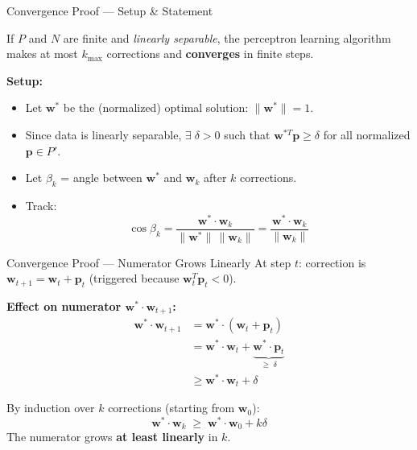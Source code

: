 \documentclass{beamer}
\begin{document}
\begin{frame}{Convergence Proof --- Setup \& Statement}
  \begin{theorem}
    If $P$ and $N$ are finite and \emph{linearly separable}, the perceptron learning
    algorithm makes at most $k_{\max}$ corrections and \textbf{converges} in finite steps.
  \end{theorem}

  \vspace{0.2cm}
  \textbf{Setup:}
  \begin{itemize}
    \item Let $\mathbf{w}^*$ be the (normalized) optimal solution: $\|\mathbf{w}^*\| = 1$.
    \item Since data is linearly separable, $\exists\;\delta > 0$ such that
          $\mathbf{w}^{*T}\mathbf{p} \geq \delta$ for all normalized $\mathbf{p} \in P'$.
    \item Let $\beta_k$ = angle between $\mathbf{w}^*$ and $\mathbf{w}_k$ after $k$ corrections.
    \item Track:
    \[
      \cos\beta_k = \frac{\mathbf{w}^*\cdot\mathbf{w}_k}{\|\mathbf{w}^*\|\,\|\mathbf{w}_k\|}
      = \frac{\mathbf{w}^*\cdot\mathbf{w}_k}{\|\mathbf{w}_k\|}
    \]
  \end{itemize}
\end{frame}

\begin{frame}{Convergence Proof --- Numerator Grows Linearly}
  At step $t$: correction is $\mathbf{w}_{t+1} = \mathbf{w}_t + \mathbf{p}_t$
  (triggered because $\mathbf{w}_t^T\mathbf{p}_t < 0$).

  \vspace{0.2cm}
  \textbf{Effect on numerator $\mathbf{w}^*\cdot\mathbf{w}_{t+1}$:}
  \begin{align*}
    \mathbf{w}^*\cdot\mathbf{w}_{t+1} &= \mathbf{w}^*\cdot(\mathbf{w}_t + \mathbf{p}_t) \\
                                        &= \mathbf{w}^*\cdot\mathbf{w}_t + \underbrace{\mathbf{w}^*\cdot\mathbf{p}_t}_{\geq\;\delta} \\[4pt]
                                        &\geq \mathbf{w}^*\cdot\mathbf{w}_t + \delta
  \end{align*}

  \vspace{0.1cm}
  By induction over $k$ corrections (starting from $\mathbf{w}_0$):
  \[
    \boxed{\mathbf{w}^*\cdot\mathbf{w}_k \;\geq\; \mathbf{w}^*\cdot\mathbf{w}_0 + k\delta}
  \]
  The numerator grows \textbf{at least linearly} in $k$.
\end{frame}
\end{document}
